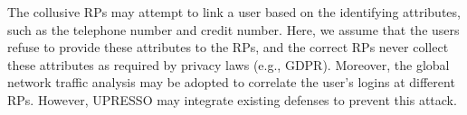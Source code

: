 The collusive RPs may attempt to link a user  based on the identifying attributes, such as the telephone number and credit number.
Here, we assume that the users refuse to provide these attributes to the RPs, and the correct RPs never collect these attributes as required by privacy laws (e.g., GDPR).
Moreover, the global network traffic analysis may be adopted to correlate the user's logins at different RPs.
  However, UPRESSO may integrate existing defenses to prevent this attack.





